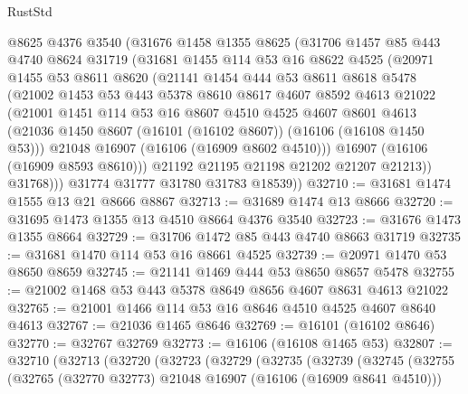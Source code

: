 \begin{lexlean}{RustStd}
\begin{coremodule}
        @8625
        @4376
        @3540
        (@31676
          @1458
          @1355
          @8625
          (@31706
            @1457
            @85
            @443
            @4740
            @8624
            @31719
            (@31681
              @1455
              @114
              @53
              @16
              @8622
              @4525
              (@20971
                @1455
                @53
                @8611
                @8620
                (@21141
                  @1454
                  @444
                  @53
                  @8611
                  @8618
                  @5478
                  (@21002
                    @1453
                    @53
                    @443
                    @5378
                    @8610
                    @8617
                    @4607
                    @8592
                    @4613
                    @21022
                    (@21001
                      @1451
                      @114
                      @53
                      @16
                      @8607
                      @4510
                      @4525
                      @4607
                      @8601
                      @4613
                      (@21036 @1450 @8607 (@16101 (@16102 @8607)) (@16106 (@16108 @1450 @53)))
                      @21048
                      @16907
                      (@16106 (@16909 @8602 @4510)))
                    @16907
                    (@16106 (@16909 @8593 @8610)))
                  @21192
                  @21195
                  @21198
                  @21202
                  @21207
                  @21213))
              @31768)))
        @31774
        @31777
        @31780
        @31783
        @18539))
@32710 := @31681 @1474 @1555 @13 @21 @8666 @8867
@32713 := @31689 @1474 @13 @8666
@32720 := @31695 @1473 @1355 @13 @4510 @8664 @4376 @3540
@32723 := @31676 @1473 @1355 @8664
@32729 := @31706 @1472 @85 @443 @4740 @8663 @31719
@32735 := @31681 @1470 @114 @53 @16 @8661 @4525
@32739 := @20971 @1470 @53 @8650 @8659
@32745 := @21141 @1469 @444 @53 @8650 @8657 @5478
@32755 := @21002 @1468 @53 @443 @5378 @8649 @8656 @4607 @8631 @4613 @21022
@32765 := @21001 @1466 @114 @53 @16 @8646 @4510 @4525 @4607 @8640 @4613
@32767 := @21036 @1465 @8646
@32769 := @16101 (@16102 @8646)
@32770 := @32767 @32769
@32773 := @16106 (@16108 @1465 @53)
@32807 := @32710
    (@32713
      (@32720
        (@32723
          (@32729
            (@32735
              (@32739
                (@32745
                  (@32755
                    (@32765 (@32770 @32773) @21048 @16907 (@16106 (@16909 @8641 @4510)))

\end{coremodule}
\end{lexlean}
